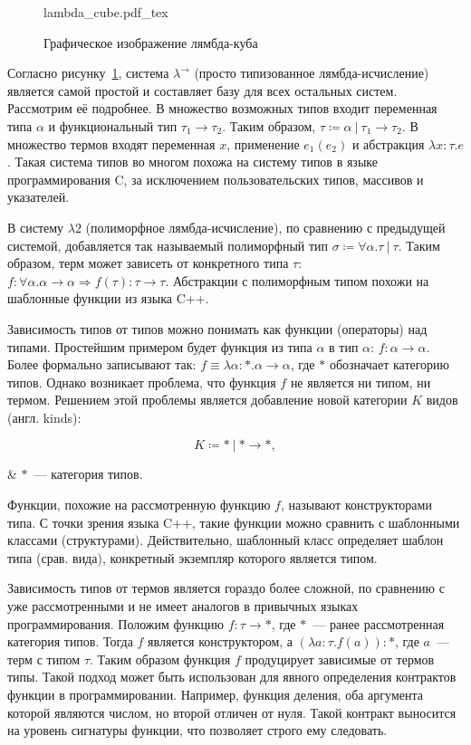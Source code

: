 \begin{figure}[H]
    \centering
    {lambda_cube.pdf_tex}
    \caption{Графическое изображение лямбда-куба}
    \label{fig:lambda_cube}
\end{figure}

Согласно рисунку~\ref{fig:lambda_cube}, система $\lambda^{\to}$ (просто типизованное лямбда-исчисление) является самой простой и составляет базу для всех остальных систем.
Рассмотрим её подробнее.
В множество возможных типов входит переменная типа $\alpha$ и функциональный тип $\tau_1 \to \tau_2$.
Таким образом, $\tau \coloneqq \alpha ~|~ \tau_1 \to \tau_2$.
В множество термов входят переменная $x$, применение $e_1(e_2)$ и абстракция $\lambda x: \tau. e$.
Такая система типов во многом похожа на систему типов в языке программирования C, за исключением пользовательских типов, массивов и указателей.

В систему $\lambda 2$ (полиморфное лямбда-исчисление), по сравнению с предыдущей системой, добавляется так называемый полиморфный тип $\sigma \coloneqq \forall \alpha. \tau ~|~ \tau$.
Таким образом, терм может зависеть от конкретного типа $\tau$: $f: \forall \alpha. \alpha \to \alpha \Rightarrow f(\tau): \tau \to \tau$.
Абстракции с полиморфным типом похожи на шаблонные функции из языка C++.

Зависимость типов от типов можно понимать как функции (операторы) над типами.
Простейшим примером будет функция из типа $\alpha$ в тип $\alpha$: $f: \alpha \to \alpha$.
Более формально записывают так: $f \equiv \lambda \alpha: *. \alpha \to \alpha$, где $*$ обозначает категорию типов.
Однако возникает проблема, что функция $f$ не является ни типом, ни термом.
Решением этой проблемы является добавление новой категории $K$ видов (англ. kinds):

\begin{equation}
    \label{eq:kinds}
    K \coloneqq * ~|~ * \to *,
\end{equation}
\begin{eqrem}
    & $*$~--- категория типов.
\end{eqrem}

Функции, похожие на рассмотренную функцию $f$, называют конструкторами типа.
С точки зрения языка C++, такие функции можно сравнить с шаблонными классами (структурами).
Действительно, шаблонный класс определяет шаблон типа (срав. вида), конкретный экземпляр которого является типом.

Зависимость типов от термов является гораздо более сложной, по сравнению с уже рассмотренными и не имеет аналогов в привычных языках программирования.
Положим функцию $f: \tau \to *$, где $*$~--- ранее рассмотренная категория типов.
Тогда $f$ является конструктором, а $(\lambda a: \tau. f(a)) : *$, где $a$~--- терм с типом $\tau$.
Таким образом функция $f$ продуцирует зависимые от термов типы.
Такой подход может быть использован для явного определения контрактов функции в программировании.
Например, функция деления, оба аргумента которой являются числом, но второй отличен от нуля.
Такой контракт выносится на уровень сигнатуры функции, что позволяет строго ему следовать.

